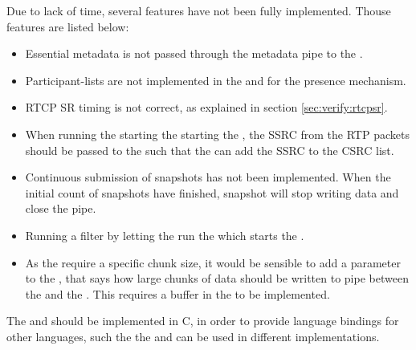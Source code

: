 \noindent{}Due to lack of time, several features have not been fully implemented.
Thouse features are listed below:
\begin{itemize}
	\item Essential metadata is not passed through the metadata pipe to the \con{}.
	\item Participant-lists are not implemented in the \sub{} and \pub{} for the presence mechanism.
	\item RTCP SR timing is not correct, as explained in section \ref{sec:verify:rtcpsr}.
	\item When running the \sub{} starting the \pub{} starting the , the SSRC from the RTP packets should be passed to the \pub{} such that the \pub{} can add the SSRC to the CSRC list. 
	\item Continuous submission of snapshots has not been implemented. When the initial count of snapshots have finished, snapshot will stop writing data and close the pipe.
	\item Running a filter by letting the \sub{} run the \pub{} which starts the .
	\item As the  require a specific chunk size, it would be sensible to add a parameter to the \sub{}, that says how large chunks of data should be written to pipe between the \sub{} and the . This requires a buffer in the \sub{} to be implemented.
\end{itemize}

The \pub{} and \sub{} should be implemented in C, in order to provide language bindings for other languages, such the the \pub{} and \sub{} can be used in different implementations.


